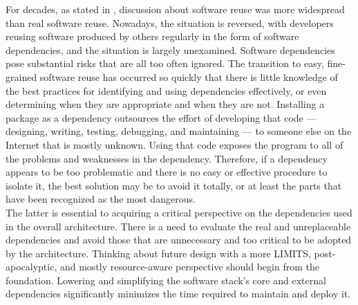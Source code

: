 For decades, as stated in \cite{software_dependency_problem}, discussion about
software reuse was more widespread than real software reuse. Nowadays, the
situation is reversed, with developers reusing software produced by others regularly
in the form of software dependencies, and the situation is largely unexamined. Software
dependencies pose substantial risks that are all too often ignored. The
transition to easy, fine-grained software reuse has occurred so quickly that there
is little knowledge of the best practices for identifying and using dependencies
effectively, or even determining when they are appropriate and when they are not.
Installing a package as a dependency outsources the effort of developing that code
--- designing, writing, testing, debugging, and maintaining --- to someone else on
the Internet that is mostly unknown. Using that code exposes the program to all
of the problems and weaknesses in the dependency. Therefore, if a dependency
appears to be too problematic and there is no easy or effective procedure to
isolate it, the best solution may be to avoid it totally, or at least the parts
that have been recognized as the most dangerous. \\ %
The latter is essential to acquiring a critical perspective on the dependencies
used in the overall architecture. There is a need to evaluate the real and unreplaceable
dependencies and avoid those that are unnecessary and too critical to be adopted
by the architecture. Thinking about future design with a more LIMITS, post-apocalyptic,
and mostly resource-aware perspective should begin from the foundation. Lowering
and simplifying the software stack's core and external dependencies significantly
minimizes the time required to maintain and deploy it. \\ %

